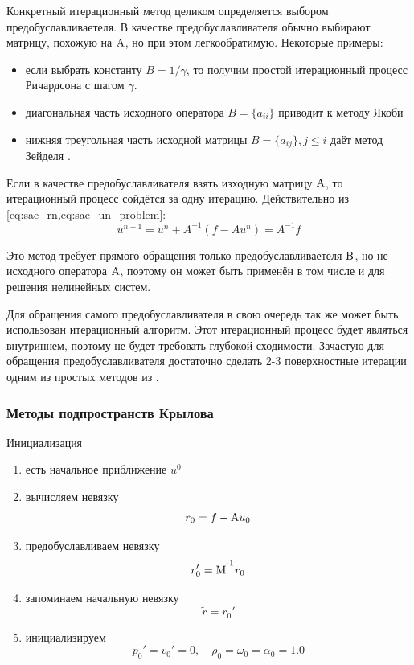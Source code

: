 Конкретный итерационный метод целиком определяется выбором предобуславливаетеля.
В качестве предобуславливателя обычно выбирают матрицу, похожую на ${\rm A}$, но при этом легкообратимую.
Некоторые примеры:
\begin{itemize}
\item если выбрать константу $B = 1/\gamma$, то получим
простой итерационный процесс Ричардсона с шагом $\gamma$.
\item диагональная часть исходного оператора $B = \{a_{ii}\}$ приводит к методу Якоби 
\item нижняя треугольная часть исходной матрицы $B = \{a_{ij}\}, j\leq i$ даёт метод Зейделя .
\end{itemize}

Если в качестве предобуславливателя взять изходную матрицу ${\rm A}$, 
то итерационный процесс сойдётся за одну итерацию. Действительно из \cref{eq:sae_rn,eq:sae_un_problem}:
\begin{equation*}
u^{n+1} = u^{n} + A^{-1}(f - A u^n) = A^{-1} f
\end{equation*}

Это метод требует прямого обращения только предобуславливаетеля ${\rm B}$, но не 
исходного оператора ${\rm A}$, поэтому он может быть применён в том числе и для решения нелинейных систем.

Для обращения самого предобуславливателя в свою очередь так же может
быть использован итерационный алгоритм. Этот итерационный процесс будет являться
внутриннем, поэтому не будет требовать глубокой сходимости.
Зачастую для обращения предобуславливателя достаточно сделать 2-3 поверхностные итерации
одним из простых методов из .

\subsubsection{Методы подпространств Крылова}

\label{sec:bicgstab}

Инициализация
\begin{enumerate}
\item есть начальное приближение $u^0$
\item вычисляем невязку
$$r_0 = f - {\rm A} u_0$$
\item предобуславливаем невязку
$$r_0' = {\rm M}^{\textsuperscript {-1}}r_0$$
\item запоминаем начальную невязку
$$\tilde r = r_0'$$
\item инициализируем
$$p_0' = v_0' = 0, \quad \rho_0 = \omega_0 = \alpha_0 = 1.0$$
\end{enumerate}


